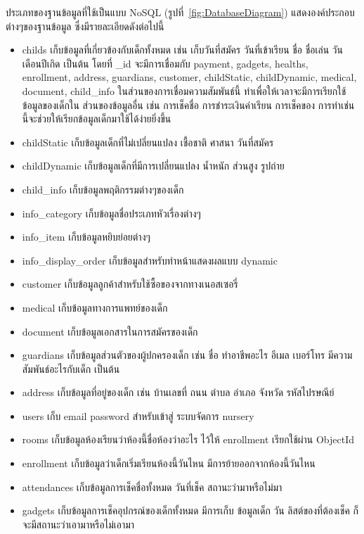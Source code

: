 ประเภทของฐานข้อมูลที่ใช้เป็นแบบ NoSQL
(รูปที่~\ref{fig:DatabaseDiagram}) แสดงองค์ประกอบต่างๆของฐานข้อมูล ซึ่งมีรายละเอียดดังต่อไปนี้
%
  \begin{itemize}
    \item childs เก็บข้อมูลที่เกี่ยวข้องกับเด็กทั้งหมด เช่น เก็บวันที่สมัคร วันที่เข้าเรียน ชื่อ ชื่อเล่น วันเดือนปีเกิด เป็นต้น  
    โดยที่ \_id จะมีการเชื่อมกับ payment, gadgets, healths, enrollment, address, guardians, customer, childStatic, childDynamic, medical, document, child\_info 
    ในส่วนของการเชื่อมความสัมพันธ์นี้ ทำเพื่อให้เวลาจะมีการเรียกใช้ข้อมูลของเด็กใน ส่วนของข้อมูลอื่น เช่น การเช็คชื่อ การชำระเงินค่าเรียน การเช็คของ การทำเช่นนี้จะช่วยให้เรียกข้อมูลเด็กมาใช้ได้ง่ายยิ่งขึ้น
    \item childStatic เก็บข้อมูลเด็กที่ไม่เปลี่ยนแปลง เชื้อชาติ ศาสนา วันที่สมัคร
    \item childDynamic เก็บข้อมูลเด็กที่มีการเปลี่ยนแปลง น้ำหนัก ส่วนสูง รูปถ่าย
    \item child\_info เก็บข้อมูลพฤติกรรมต่างๆของเด็ก
    \item info\_category เก็บข้อมูลชื่อประเภทหัวเรื่องต่างๆ
    \item info\_item เก็บข้อมูลหยิบย่อยต่างๆ
    \item info\_display\_order เก็บข้อมูลสำหรับทำหน้าแสดงผลแบบ dynamic
    \item customer เก็บข้อมูลลูกค้าสำหรับใช้ซื้อของจากทางเนอสเซอรี่
    \item medical เก็บข้อมูลทางการแพทย์ของเด็ก
    \item document เก็บข้อมูลเอกสารในการสมัครของเด็ก
    \item guardians เก็บข้อมูลส่วนตัวของผู้ปกครองเด็ก เช่น ชื่อ ทำอาชีพอะไร อีเมล เบอร์โทร มีความสัมพันธ์อะไรกับเด็ก เป็นต้น
    \item address เก็บข้อมูลที่อยู่ของเด็ก เช่น บ้านเลขที่ ถนน ตำบล อำเภอ จังหวัด รหัสไปรษณีย์ 
    \item users เก็บ email password สำหรับเข้าสู่ ระบบจัดการ nursery 
    \item rooms เก็บข้อมูลห้องเรียนว่าห้องนี้ชื่อห้องว่าอะไร ไว้ให้ enrollment เรียกใช้ผ่าน ObjectId
    \item enrollment เก็บข้อมูลว่าเด็กเริ่มเรียนห้องนี้วันไหน มีการย้ายออกจากห้องนี้วันไหน
    \item attendances เก็บข้อมูลการเช็คชื่อทั้งหมด วันที่เช็ค สถานะว่ามาหรือไม่มา
    \item gadgets เก็บข้อมูลการเช็คอุปกรณ์ของเด็กทั้งหมด มีการเก็บ ข้อมูลเด็ก วัน ลิสต์ของที่ต้องเช็ค ก็จะมีสถานะว่าเอามาหรือไม่เอามา

\end{itemize}
